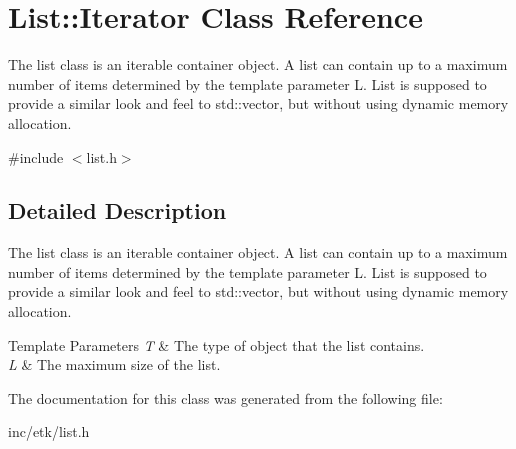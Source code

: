 \hypertarget{class_list_1_1_iterator}{\section{List\-:\-:Iterator Class Reference}
\label{class_list_1_1_iterator}
}


The list class is an iterable container object. A list can contain up to a maximum number of items determined by the template parameter L. List is supposed to provide a similar look and feel to std\-::vector, but without using dynamic memory allocation.  




{\ttfamily \#include $<$list.\-h$>$}



\subsection{Detailed Description}
The list class is an iterable container object. A list can contain up to a maximum number of items determined by the template parameter L. List is supposed to provide a similar look and feel to std\-::vector, but without using dynamic memory allocation. 


\begin{DoxyTemplParams}{Template Parameters}
{\em T} & The type of object that the list contains. \\
\hline
{\em L} & The maximum size of the list. \\
\hline
\end{DoxyTemplParams}


The documentation for this class was generated from the following file\-:\begin{DoxyCompactItemize}
\item 
inc/etk/list.\-h\end{DoxyCompactItemize}
